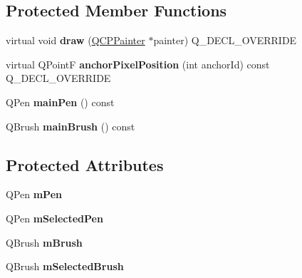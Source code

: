 \subsection*{Protected Member Functions}
\begin{DoxyCompactItemize}
\item 
virtual void {\bfseries draw} (\hyperlink{classQCPPainter}{Q\+C\+P\+Painter} $\ast$painter) Q\+\_\+\+D\+E\+C\+L\+\_\+\+O\+V\+E\+R\+R\+I\+DE\hypertarget{classQCPItemEllipse_a77eebd67a402fc496082a2e51356928c}{}\label{classQCPItemEllipse_a77eebd67a402fc496082a2e51356928c}

\item 
virtual Q\+PointF {\bfseries anchor\+Pixel\+Position} (int anchor\+Id) const Q\+\_\+\+D\+E\+C\+L\+\_\+\+O\+V\+E\+R\+R\+I\+DE\hypertarget{classQCPItemEllipse_a35cd6983c61a16ac33c23f08dd2817cc}{}\label{classQCPItemEllipse_a35cd6983c61a16ac33c23f08dd2817cc}

\item 
Q\+Pen {\bfseries main\+Pen} () const \hypertarget{classQCPItemEllipse_afc78d49ed5ffa886bccf18f297f83d30}{}\label{classQCPItemEllipse_afc78d49ed5ffa886bccf18f297f83d30}

\item 
Q\+Brush {\bfseries main\+Brush} () const \hypertarget{classQCPItemEllipse_a2a9757204877c9d0fd07adfb26d6b1d8}{}\label{classQCPItemEllipse_a2a9757204877c9d0fd07adfb26d6b1d8}

\end{DoxyCompactItemize}
\subsection*{Protected Attributes}
\begin{DoxyCompactItemize}
\item 
Q\+Pen {\bfseries m\+Pen}\hypertarget{classQCPItemEllipse_a16ad9389acf028a7e4ac8fd7a550b2e4}{}\label{classQCPItemEllipse_a16ad9389acf028a7e4ac8fd7a550b2e4}

\item 
Q\+Pen {\bfseries m\+Selected\+Pen}\hypertarget{classQCPItemEllipse_a57b047abfce6f1a84ed46ca668c90e21}{}\label{classQCPItemEllipse_a57b047abfce6f1a84ed46ca668c90e21}

\item 
Q\+Brush {\bfseries m\+Brush}\hypertarget{classQCPItemEllipse_a6fa59478cd3ad1b10e6c1f6cedc84bd6}{}\label{classQCPItemEllipse_a6fa59478cd3ad1b10e6c1f6cedc84bd6}

\item 
Q\+Brush {\bfseries m\+Selected\+Brush}\hypertarget{classQCPItemEllipse_a2e49d5547478aa36910ed8a2dcc8a5c0}{}\label{classQCPItemEllipse_a2e49d5547478aa36910ed8a2dcc8a5c0}

\end{DoxyCompactItemize}
